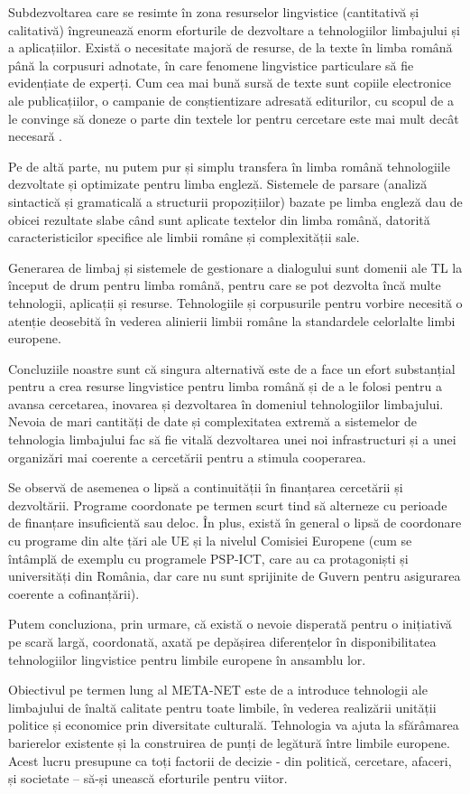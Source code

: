 \documentclass[]{../../metanetpaper}
\begin{document}
\begin{multicols}{2}
Subdezvoltarea care se resimte în zona resurselor lingvistice (cantitativă și calitativă) îngreunează enorm eforturile de dezvoltare a tehnologiilor limbajului și a aplicațiilor. Există o necesitate majoră de resurse, de la texte în limba română până la corpusuri adnotate, în care fenomene lingvistice particulare să fie evidențiate de experți. Cum cea mai bună sursă de texte sunt copiile electronice ale publicațiilor, o campanie de conștientizare adresată editurilor, cu scopul de a le convinge să doneze o parte din textele lor pentru cercetare este mai mult decât necesară \cite{cristea4}.

Pe de altă parte, nu putem pur și simplu transfera în limba română tehnologiile dezvoltate și optimizate pentru limba engleză. Sistemele de parsare (analiză sintactică și gramaticală a structurii propozițiilor) bazate pe limba engleză dau de obicei rezultate slabe când sunt aplicate textelor din limba română, datorită caracteristicilor specifice ale limbii române și complexității sale.

Generarea de limbaj și sistemele de gestionare a dialogului sunt domenii ale TL la început de drum pentru limba română, pentru care se pot dezvolta încă multe tehnologii, aplicații și resurse. Tehnologiile și corpusurile pentru vorbire necesită o atenție deosebită în vederea alinierii limbii române la standardele celorlalte limbi europene.

Concluziile noastre sunt că singura alternativă este de a face un efort substanțial pentru a crea resurse lingvistice pentru limba română și de a le folosi pentru a avansa cercetarea, inovarea și dezvoltarea în domeniul tehnologiilor limbajului. Nevoia de mari cantități de date și complexitatea extremă a sistemelor de tehnologia limbajului fac să fie vitală dezvoltarea unei noi infrastructuri și a unei organizări mai coerente a cercetării pentru a stimula cooperarea.

Se observă de asemenea o lipsă a continuității în finanțarea cercetării și dezvoltării. Programe coordonate pe termen scurt tind să alterneze cu perioade de finanțare insuficientă sau deloc. În plus, există în general o lipsă de coordonare cu programe din alte țări ale UE și la nivelul Comisiei Europene (cum se întâmplă de exemplu cu programele PSP-ICT, care au ca protagoniști și universități din România, dar care nu sunt sprijinite de Guvern pentru asigurarea coerente a cofinanțării).

Putem concluziona, prin urmare, că există o nevoie disperată pentru o inițiativă pe scară largă, coordonată, axată pe depășirea diferențelor în disponibilitatea tehnologiilor lingvistice pentru limbile europene în ansamblu lor.

Obiectivul pe termen lung al META-NET este de a introduce tehnologii ale limbajului de înaltă calitate pentru toate limbile, în vederea realizării unității politice și economice prin diversitate culturală. Tehnologia va ajuta la sfărâmarea barierelor existente și la construirea de punți de legătură între limbile europene. Acest lucru presupune ca toți factorii de decizie - din politică, cercetare, afaceri, și societate – să-și unească eforturile pentru viitor.

\end{multicols}
\end{document}
